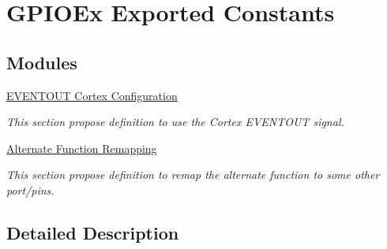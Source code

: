 \hypertarget{group___g_p_i_o_ex___exported___constants}{}\section{G\+P\+I\+O\+Ex Exported Constants}
\label{group___g_p_i_o_ex___exported___constants}
\subsection*{Modules}
\begin{DoxyCompactItemize}
\item 
\hyperlink{group___g_p_i_o_ex___e_v_e_n_t_o_u_t}{E\+V\+E\+N\+T\+O\+U\+T Cortex Configuration}
\begin{DoxyCompactList}\small\item\em This section propose definition to use the Cortex E\+V\+E\+N\+T\+O\+UT signal. \end{DoxyCompactList}\item 
\hyperlink{group___g_p_i_o_ex___a_f_i_o___a_f___r_e_m_a_p_p_i_n_g}{Alternate Function Remapping}
\begin{DoxyCompactList}\small\item\em This section propose definition to remap the alternate function to some other port/pins. \end{DoxyCompactList}\end{DoxyCompactItemize}


\subsection{Detailed Description}
